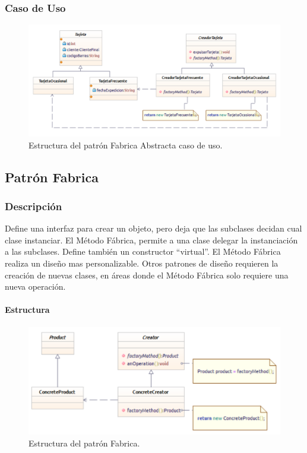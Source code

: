 \subsubsection{Caso de Uso}
\begin{figure}[th!]
	\centering
	\includegraphics[width=.7\linewidth]{imagenes/Patrones/Fabrica_caso.pdf}
	\caption{Estructura del patrón Fabrica Abstracta caso de uso.\cite{gof}}	
\end{figure}

\subsection{Patrón Fabrica}
\subsubsection{Descripción}
Define una interfaz para crear un objeto, pero deja que las subclases decidan cual clase instanciar. El Método Fábrica, permite a una clase delegar la instanciación a las subclases. Define también un constructor “virtual”.
El Método Fábrica realiza un diseño mas personalizable. Otros patrones de diseño requieren la creación de nuevas clases, en áreas donde el Método Fábrica solo requiere una nueva operación.


\paragraph{Estructura}

\begin{figure}[th!]
	\centering
	\includegraphics[width=.7\linewidth]{imagenes/Patrones/Builder.pdf}
	\caption{Estructura del patrón Fabrica.\cite{gof}}	
\end{figure}


